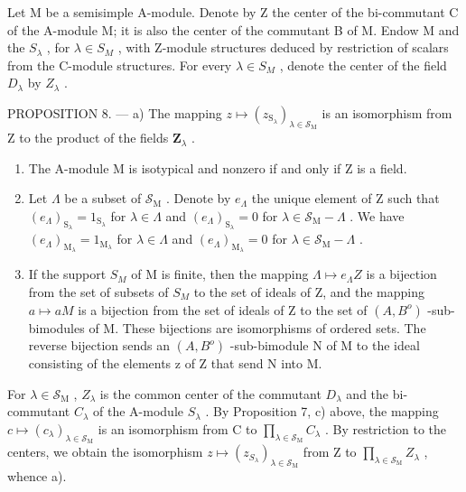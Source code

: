 Let M be a semisimple A-module. Denote by Z the center of the bi-commutant C of the A-module M; it is also the center of the commutant B of M. Endow M and the \(S_{\lambda}\) , for \(\lambda \in S_{M}\) , with Z-module structures deduced by restriction of scalars from the C-module structures. For every \(\lambda \in S_{M}\) , denote the center of the field \(D_{\lambda}\) by \(Z_{\lambda}\) .

PROPOSITION 8. --- a) The mapping \(z \mapsto (z_{\mathrm{S}_{\lambda}})_{\lambda \in \mathcal{S}_{\mathrm{M}}}\) is an isomorphism from Z to the product of the fields \(\mathbf{Z}_{\lambda}\) .

\begin{enumerate}
\def\labelenumi{\alph{enumi})}
\setcounter{enumi}{1}
\item
  The A-module M is isotypical and nonzero if and only if Z is a field.
\item
  Let \(\Lambda\) be a subset of \(\mathcal{S}_{\mathrm{M}}\) . Denote by \(e_{\Lambda}\) the unique element of \(\mathrm{Z}\) such that \((e_{\Lambda})_{\mathrm{S}_{\lambda}} = 1_{\mathrm{S}_{\lambda}}\) for \(\lambda \in \Lambda\) and \((e_{\Lambda})_{\mathrm{S}_{\lambda}} = 0\) for \(\lambda \in \mathcal{S}_{\mathrm{M}} - \Lambda\) . We have \((e_{\Lambda})_{\mathrm{M}_{\lambda}} = 1_{\mathrm{M}_{\lambda}}\) for \(\lambda \in \Lambda\) and \((e_{\Lambda})_{\mathrm{M}_{\lambda}} = 0\) for \(\lambda \in \mathcal{S}_{\mathrm{M}} - \Lambda\) .
\item
  If the support \(S_{M}\) of M is finite, then the mapping \(\Lambda \mapsto e_{\Lambda}Z\) is a bijection from the set of subsets of \(S_{M}\) to the set of ideals of Z, and the mapping \(a \mapsto aM\) is a bijection from the set of ideals of Z to the set of \((A,B^{o})\) -sub-bimodules of M. These bijections are isomorphisms of ordered sets. The reverse bijection sends an \((A,B^{o})\) -sub-bimodule N of M to the ideal consisting of the elements z of Z that send N into M.
\end{enumerate}

For \(\lambda \in \mathcal{S}_{\mathrm{M}}\) , \(Z_{\lambda}\) is the common center of the commutant \(D_{\lambda}\) and the bi-commutant \(C_{\lambda}\) of the A-module \(S_{\lambda}\) . By Proposition 7, c) above, the mapping \(c \mapsto (c_{\lambda})_{\lambda \in \mathcal{S}_{\mathrm{M}}}\) is an isomorphism from C to \(\prod_{\lambda \in \mathcal{S}_{\mathrm{M}}} C_{\lambda}\) . By restriction to the centers, we obtain the isomorphism \(z \mapsto (z_{S_{\lambda}})_{\lambda \in \mathcal{S}_{\mathrm{M}}}\) from Z to \(\prod_{\lambda \in \mathcal{S}_{\mathrm{M}}} Z_{\lambda}\) , whence a).

